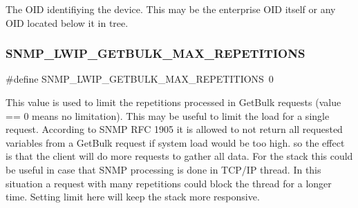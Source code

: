 The O\+ID identifiying the device. This may be the enterprise O\+ID itself or any O\+ID located below it in tree. \mbox{\label{group__snmp__opts_ga5a24152aa5f3c2837b9a3145aa3c59f3}} 
\subsubsection{\texorpdfstring{S\+N\+M\+P\+\_\+\+L\+W\+I\+P\+\_\+\+G\+E\+T\+B\+U\+L\+K\+\_\+\+M\+A\+X\+\_\+\+R\+E\+P\+E\+T\+I\+T\+I\+O\+NS}{SNMP\_LWIP\_GETBULK\_MAX\_REPETITIONS}\hspace{0.1cm}{\footnotesize\ttfamily [1/2]}}
{\footnotesize\ttfamily \#define S\+N\+M\+P\+\_\+\+L\+W\+I\+P\+\_\+\+G\+E\+T\+B\+U\+L\+K\+\_\+\+M\+A\+X\+\_\+\+R\+E\+P\+E\+T\+I\+T\+I\+O\+NS~0}

This value is used to limit the repetitions processed in Get\+Bulk requests (value == 0 means no limitation). This may be useful to limit the load for a single request. According to S\+N\+MP R\+FC 1905 it is allowed to not return all requested variables from a Get\+Bulk request if system load would be too high. so the effect is that the client will do more requests to gather all data. For the stack this could be useful in case that S\+N\+MP processing is done in T\+C\+P/\+IP thread. In this situation a request with many repetitions could block the thread for a longer time. Setting limit here will keep the stack more responsive. \mbox{\label{group__snmp__opts_ga5a24152aa5f3c2837b9a3145aa3c59f3}} 
